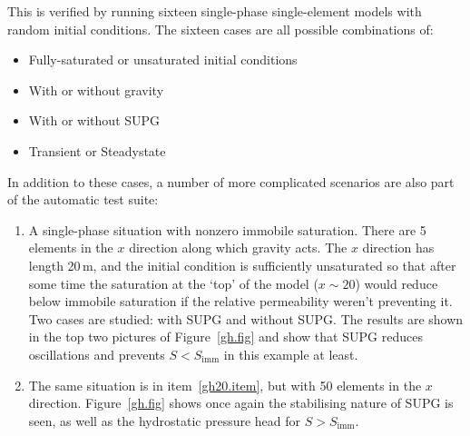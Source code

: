 \documentclass[]{scrreprt}
\begin{document}
This is verified by running sixteen single-phase single-element models
with random initial conditions.  The sixteen cases are all possible
combinations of:
\begin{itemize}
\item Fully-saturated or unsaturated initial conditions
\item With or without gravity
\item With or without SUPG
\item Transient or Steadystate
\end{itemize}

In addition to these cases, a number of more complicated scenarios are
also part of the automatic test suite:
\begin{enumerate}
\item\label{gh20.item} A single-phase situation with nonzero immobile saturation.
  There are 5 elements in the $x$ direction along which gravity acts.
  The $x$ direction has length 20\,m, and the initial condition is
  sufficiently unsaturated so that after some time the saturation at
  the `top' of the model ($x\sim 20$) would reduce below immobile
  saturation if the relative permeability weren't preventing it.  Two
  cases are studied: with SUPG and without SUPG.  The results are
  shown in the top two pictures of Figure~\ref{gh.fig} and show that
  SUPG reduces oscillations and prevents $S<S_{\mathrm{imm}}$ in this
  example at least.
\item The same situation is in item~\ref{gh20.item}, but with 50
  elements in the $x$ direction.  Figure~\ref{gh.fig} shows once again
  the stabilising nature of SUPG is seen, as well as the hydrostatic
  pressure head for $S>S_{\mathrm{imm}}$.
\end{enumerate}
\end{document}
